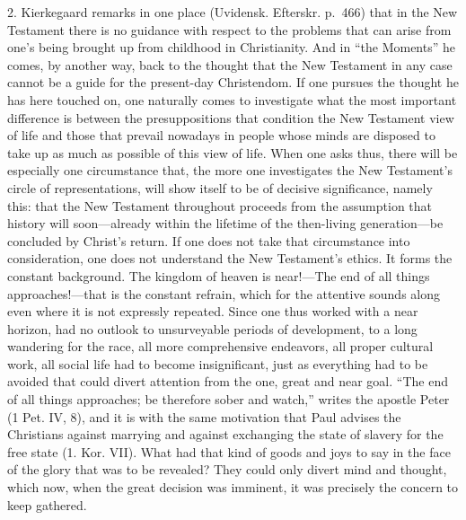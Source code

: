 \documentclass[12pt,a4paper]{book}
\newcommand{\opage}[1]{\marginnote{\footnotesize\textit{[#1]}}}
\begin{document}
2. Kierkegaard remarks in one place (Uvidensk. Efterskr. p.~466) that in
the New Testament there is no guidance with respect to the problems that
can arise from one's being brought up from childhood in Christianity. And
in ``the Moments'' he comes, by another way, back to the thought that the
New Testament in any case cannot be a guide for the present-day
Christendom. If one pursues the thought he has here touched on, one
naturally comes to investigate what the most important difference is
between the presuppositions that condition the New Testament view of life
and those that prevail nowadays in people whose minds are disposed to
take up as much as possible of this view of life. When one asks thus,
there will be especially
\opage{152}one circumstance that, the more one investigates the New
Testament's circle of representations, will show itself to be of
decisive significance, namely this: that the New Testament throughout
proceeds from the assumption that history will soon---already within the
lifetime of the then-living generation---be concluded by Christ's return.
If one does not take that circumstance into consideration, one does not
understand the New Testament's ethics. It forms the constant background.
The kingdom of heaven is near!---The end of all things approaches!---that
is the constant refrain, which for the attentive sounds along even where
it is not expressly repeated. Since one thus worked with a near horizon,
had no outlook to unsurveyable periods of development, to a long
wandering for the race, all more comprehensive endeavors, all proper
cultural work, all social life had to become insignificant, just as
everything had to be avoided that could divert attention from the one,
great and near goal. ``The end of all things approaches; be therefore
sober and watch,'' writes the apostle Peter (1 Pet. IV, 8), and it is
with the same motivation that Paul advises the Christians against
marrying and against exchanging the state of slavery for the free state
(1. Kor. VII). What had that kind of goods and joys to say in the face of
the glory that was to be revealed? They could only divert mind and
thought, which now, when the great decision was imminent, it was
precisely the concern to keep gathered.
\end{document}
